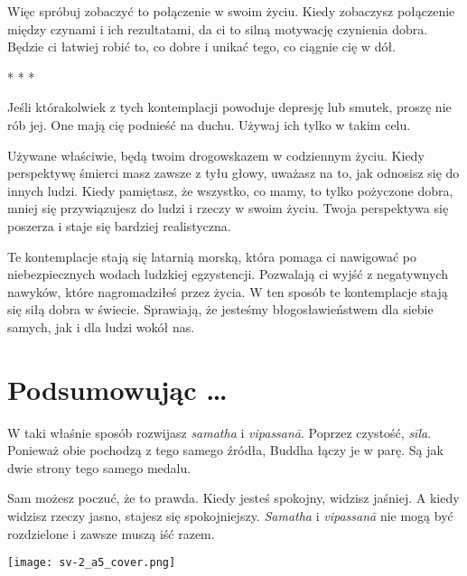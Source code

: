 \documentclass[12pt,openany]{book}
\begin{document}
Więc spróbuj zobaczyć to połączenie w swoim życiu. Kiedy zobaczysz połączenie między czynami i ich rezultatami, da ci to silną motywację czynienia dobra. Będzie ci łatwiej robić to, co dobre i unikać tego, co ciągnie cię w dół.

\begin{center}
* * *
\end{center}

Jeśli którakolwiek z tych kontemplacji powoduje depresję lub smutek, proszę nie rób jej. One mają cię podnieść na duchu. Używaj ich tylko w takim celu.

Używane właściwie, będą twoim drogowskazem w codziennym życiu. Kiedy perspektywę śmierci masz zawsze z tyłu głowy, uważasz na to, jak odnosisz się do innych ludzi. Kiedy pamiętasz, że wszystko, co mamy, to tylko pożyczone dobra, mniej się przywiązujesz do ludzi i rzeczy w swoim życiu. Twoja perspektywa się poszerza i staje się bardziej realistyczna.

Te kontemplacje stają się latarnią morską, która pomaga ci nawigować po niebezpiecznych wodach ludzkiej egzystencji. Pozwalają ci wyjść z negatywnych nawyków, które nagromadziłeś przez życia. W ten sposób te kontemplacje stają się siłą dobra w świecie. Sprawiają, że jesteśmy błogosławieństwem dla siebie samych, jak i dla ludzi wokół nas.

\chapter*{Podsumowując …}

W taki właśnie sposób rozwijasz \textit{samatha} i \textit{vipassanā}. Poprzez czystość, \textit{sīla}. Ponieważ obie pochodzą z tego samego źródła, Buddha łączy je w parę. Są jak dwie strony tego samego medalu.

Sam możesz poczuć, że to prawda. Kiedy jesteś spokojny, widzisz jaśniej. A kiedy widzisz rzeczy jasno, stajesz się spokojniejszy. \textit{Samatha} i \textit{vipassanā} nie mogą być rozdzielone i zawsze muszą iść razem.



\hspace*{-7mm}
\texttt{[image: sv-2\_a5\_cover.png]}
\end{document}
